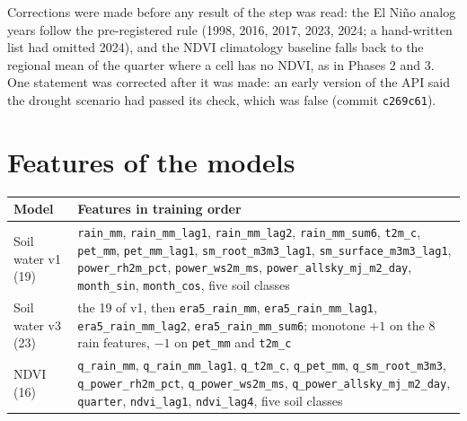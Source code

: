 \documentclass[11pt,a4paper]{article}
\begin{document}
Corrections were made before any result of the step was read: the El Ni\~no analog years follow the pre-registered
rule (1998, 2016, 2017, 2023, 2024; a hand-written list had omitted 2024), and the NDVI climatology baseline falls back to
the regional mean of the quarter where a cell has no NDVI, as in Phases 2 and 3. One statement was corrected after it was
made: an early version of the API said the drought scenario had passed its check, which was false (commit \texttt{c269c61}).

\section{Features of the models}
\begin{table}[H]
\centering\small
\begin{tabularx}{\textwidth}{lX}
\toprule
Model & Features in training order \\
\midrule
Soil water v1 (19) & \texttt{rain\_mm}, \texttt{rain\_mm\_lag1}, \texttt{rain\_mm\_lag2}, \texttt{rain\_mm\_sum6}, \texttt{t2m\_c}, \texttt{pet\_mm}, \texttt{pet\_mm\_lag1}, \texttt{sm\_root\_m3m3\_lag1}, \texttt{sm\_surface\_m3m3\_lag1}, \texttt{power\_rh2m\_pct}, \texttt{power\_ws2m\_ms}, \texttt{power\_allsky\_mj\_m2\_day}, \texttt{month\_sin}, \texttt{month\_cos}, five soil classes \\
Soil water v3 (23) & the 19 of v1, then \texttt{era5\_rain\_mm}, \texttt{era5\_rain\_mm\_lag1}, \texttt{era5\_rain\_mm\_lag2}, \texttt{era5\_rain\_mm\_sum6}; monotone $+1$ on the 8 rain features, $-1$ on \texttt{pet\_mm} and \texttt{t2m\_c} \\
NDVI (16) & \texttt{q\_rain\_mm}, \texttt{q\_rain\_mm\_lag1}, \texttt{q\_t2m\_c}, \texttt{q\_pet\_mm}, \texttt{q\_sm\_root\_m3m3}, \texttt{q\_power\_rh2m\_pct}, \texttt{q\_power\_ws2m\_ms}, \texttt{q\_power\_allsky\_mj\_m2\_day}, \texttt{quarter}, \texttt{ndvi\_lag1}, \texttt{ndvi\_lag4}, five soil classes \\
\bottomrule
\end{tabularx}
\end{table}
\end{document}
